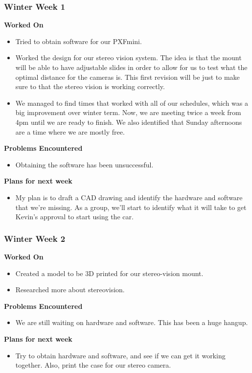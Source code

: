 \documentclass[compsoc,draftclsnofoot,onecolumn,10pt]{IEEEtran}
\begin{document}
\subsubsection*{Winter Week 1}
\textbf{Worked On}
\begin{itemize}
    \item Tried to obtain software for our PXFmini.
    \item Worked the design for our stereo vision system. The idea is that the mount will be able to have adjustable slides in order to allow for us to test what the optimal distance for the cameras is. This first revision will be just to make sure to that the stereo vision is working correctly.
    \item We managed to find times that worked with all of our schedules, which was a big improvement over winter term. Now, we are meeting twice a week from 4pm until we are ready to finish. We also identified that Sunday afternoons are a time where we are mostly free.
\end{itemize}
\textbf{Problems Encountered}
\begin{itemize}
    \item Obtaining the software has been unsuccessful.
\end{itemize}
\textbf{Plans for next week}
\begin{itemize}
    \item My plan is to draft a CAD drawing and identify the hardware and software that we're missing. As a group, we'll start to identify what it will take to get Kevin's approval to start using the car.
\end{itemize}


\subsubsection*{Winter Week 2}
\textbf{Worked On}
\begin{itemize}
    \item Created a model to be 3D printed for our stereo-vision mount.
    \item Researched more about stereovision.
\end{itemize}
\textbf{Problems Encountered}
\begin{itemize}
    \item We are still waiting on hardware and software. This has been a huge hangup.
\end{itemize}
\textbf{Plans for next week}
\begin{itemize}
    \item Try to obtain hardware and software, and see if we can get it working together. Also, print the case for our stereo camera.
\end{itemize}
\end{document}
